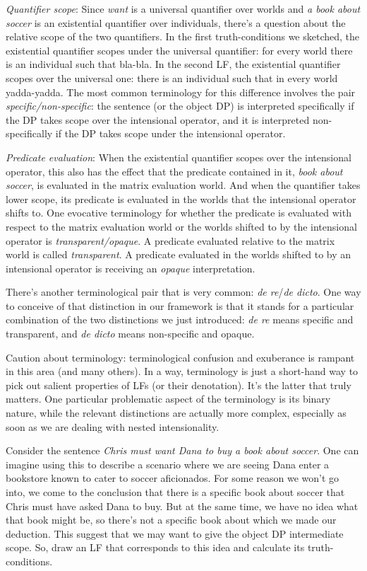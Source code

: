 \emph{Quantifier scope}: Since \emph{want} is a universal quantifier over
worlds and \emph{a book about soccer} is an existential quantifier over
individuals, there's a question about the relative scope of the two quantifiers.
In the first truth-conditions we sketched, the existential quantifier scopes
under the universal quantifier: for every world there is an individual such that
bla-bla. In the second LF, the existential quantifier scopes over the universal
one: there is an individual such that in every world yadda-yadda. The most
common terminology for this difference involves the pair
\emph{specific/non-specific}: the sentence (or the object DP) is interpreted
specifically if the DP takes scope over the intensional operator, and it is
interpreted non-specifically if the DP takes scope under the intensional operator.

\emph{Predicate evaluation}: When the existential quantifier scopes over the
intensional operator, this also has the effect that the predicate contained in
it, \emph{book about soccer}, is evaluated in the matrix evaluation world. And
when the quantifier takes lower scope, its predicate is evaluated in the worlds
that the intensional operator shifts to. One evocative terminology for whether
the predicate is evaluated with respect to the matrix evaluation world or the
worlds shifted to by the intensional operator is \emph{transparent/opaque}. A
predicate evaluated relative to the matrix world is called \emph{transparent}. A
predicate evaluated in the worlds shifted to by an intensional operator is
receiving an \emph{opaque} interpretation.

There's another terminological pair that is very common: \emph{de re}/\emph{de
  dicto}. One way to conceive of that distinction in our framework is that it
stands for a particular combination of the two distinctions we just introduced:
\emph{de re} means specific and transparent, and \emph{de dicto} means
non-specific and opaque.

Caution about terminology: terminological confusion and exuberance is rampant in
this area (and many others). In a way, terminology is just a short-hand way to
pick out salient properties of LFs (or their denotation). It's the latter that
truly matters. One particular problematic aspect of the terminology is its
binary nature, while the relevant distinctions are actually more complex,
especially as soon as we are dealing with nested intensionality.

\begin{exercise}
  Consider the sentence \emph{Chris must want Dana to buy a book about soccer}.
  One can imagine using this to describe a scenario where we are seeing Dana
  enter a bookstore known to cater to soccer aficionados. For some reason we
  won't go into, we come to the conclusion that there is a specific book about
  soccer that Chris must have asked Dana to buy. But at the same time, we have
  no idea what that book might be, so there's not a specific book about which we
  made our deduction. This suggest that we may want to give the object DP
  intermediate scope. So, draw an LF that corresponds to this idea and calculate
  its truth-conditions. \eex
\end{exercise}

